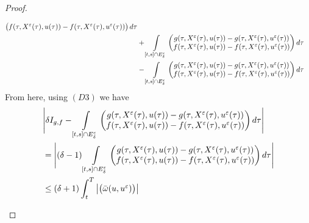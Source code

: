 \begin{proof}
\begin{asparaenum}
\begin{align*}
\begin{pmatrix}
                    f(\tau, X^{\veps}(\tau), u(\tau)) - f(\tau, X^{\veps}(\tau), u^{\veps}(\tau)) 
                \end{pmatrix} d\tau \\
            &+  \int\limits_{[t,s]\cap E_{\delta}^{\veps}} %
                \begin{pmatrix}
                    g(\tau, X^{\veps}(\tau), u(\tau)) - g(\tau, X^{\veps}(\tau), u^{\veps}(\tau)) \\
                    f(\tau, X^{\veps}(\tau), u(\tau)) - f(\tau, X^{\veps}(\tau), u^{\veps}(\tau)) 
                \end{pmatrix} d\tau \\
            &- \int\limits_{[t,s]\cap E_{\delta}^{\veps}} %
                \begin{pmatrix}
                    g(\tau, X^{\veps}(\tau), u(\tau)) - g(\tau, X^{\veps}(\tau), u^{\veps}(\tau)) \\
                    f(\tau, X^{\veps}(\tau), u(\tau)) - f(\tau, X^{\veps}(\tau), u^{\veps}(\tau)) 
                \end{pmatrix} d\tau 
        \end{align*}
        From here, using $(D3)$ we have
        \begin{align*}
            &\Bigg\vert \delta I_{g,f}  %
            - \int\limits_{[t,s]\cap E_{\delta}^{\veps}} %
                \begin{pmatrix}
                    g(\tau, X^{\veps}(\tau), u(\tau)) - g(\tau, X^{\veps}(\tau), u^{\veps}(\tau)) \\
                    f(\tau, X^{\veps}(\tau), u(\tau)) - f(\tau, X^{\veps}(\tau), u^{\veps}(\tau)) 
                \end{pmatrix} d\tau \Bigg\vert \\
            &= \Bigg\vert  (\delta -1) \int\limits_{[t,s]\cap E_{\delta}^{\veps}} %
                \begin{pmatrix}
                    g(\tau, X^{\veps}(\tau), u(\tau)) - g(\tau, X^{\veps}(\tau), u^{\veps}(\tau)) \\
                    f(\tau, X^{\veps}(\tau), u(\tau)) - f(\tau, X^{\veps}(\tau), u^{\veps}(\tau)) 
                \end{pmatrix} d\tau \Bigg\vert \\
            &\leq (\delta + 1) \int_{t}^{T}%
                \abs{\begin{pmatrix}
                    \Bar{\omega}(u, u^{\veps}) \\

\end{pmatrix}}
\end{align*}
\end{asparaenum}
\end{proof}
